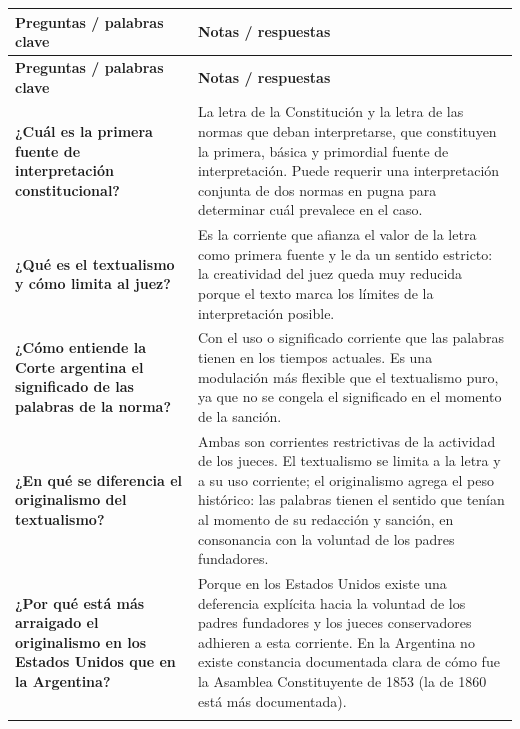 \documentclass[12pt,oneside]{book}
\begin{document}
\begin{longtable}{@{}>{\RaggedRight\arraybackslash}p{}>{\RaggedRight\arraybackslash}p{}@{}}
\toprule
\textbf{Preguntas / palabras clave} & \textbf{Notas / respuestas} \\
\midrule
\endfirsthead
\toprule
\textbf{Preguntas / palabras clave} & \textbf{Notas / respuestas} \\
\midrule
\endhead
\bottomrule
\endlastfoot

\textbf{¿Cuál es la primera fuente de interpretación constitucional?} &
La letra de la Constitución y la letra de las normas que deban interpretarse, que constituyen la primera, básica y primordial fuente de interpretación. Puede requerir una interpretación conjunta de dos normas en pugna para determinar cuál prevalece en el caso. \\
\addlinespace[0.3em]\cmidrule[0.2pt]{1-2}\addlinespace[0.3em]

\textbf{¿Qué es el textualismo y cómo limita al juez?} &
Es la corriente que afianza el valor de la letra como primera fuente y le da un sentido estricto: la creatividad del juez queda muy reducida porque el texto marca los límites de la interpretación posible. \\
\addlinespace[0.3em]\cmidrule[0.2pt]{1-2}\addlinespace[0.3em]

\textbf{¿Cómo entiende la Corte argentina el significado de las palabras de la norma?} &
Con el uso o significado corriente que las palabras tienen en los tiempos actuales. Es una modulación más flexible que el textualismo puro, ya que no se congela el significado en el momento de la sanción. \\
\addlinespace[0.3em]\cmidrule[0.2pt]{1-2}\addlinespace[0.3em]

\textbf{¿En qué se diferencia el originalismo del textualismo?} &
Ambas son corrientes restrictivas de la actividad de los jueces. El textualismo se limita a la letra y a su uso corriente; el originalismo agrega el peso histórico: las palabras tienen el sentido que tenían al momento de su redacción y sanción, en consonancia con la voluntad de los padres fundadores. \\
\addlinespace[0.3em]\cmidrule[0.2pt]{1-2}\addlinespace[0.3em]

\textbf{¿Por qué está más arraigado el originalismo en los Estados Unidos que en la Argentina?} &
Porque en los Estados Unidos existe una deferencia explícita hacia la voluntad de los padres fundadores y los jueces conservadores adhieren a esta corriente. En la Argentina no existe constancia documentada clara de cómo fue la Asamblea Constituyente de 1853 (la de 1860 está más documentada). \\
\addlinespace[0.3em]\cmidrule[0.2pt]{1-2}\addlinespace[0.3em]


\end{longtable}
\end{document}

